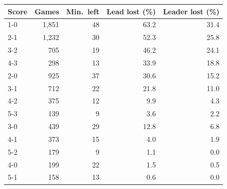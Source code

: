 \begin{tabular}{lrrrr}\toprule
Score & Games & Min.\ left & Lead lost (\%) & Leader lost (\%)\\\midrule
1-0 & 1,851 & 48 & 63.2 & 31.4\\
2-1 & 1,232 & 30 & 52.3 & 25.8\\
3-2 & 705 & 19 & 46.2 & 24.1\\
4-3 & 298 & 13 & 33.9 & 18.8\\
2-0 & 925 & 37 & 30.6 & 15.2\\
3-1 & 712 & 22 & 21.8 & 11.0\\
4-2 & 375 & 12 & 9.9 & 4.3\\
5-3 & 139 & 9 & 3.6 & 2.2\\
3-0 & 439 & 29 & 12.8 & 6.8\\
4-1 & 373 & 15 & 4.0 & 1.9\\
5-2 & 179 & 9 & 1.1 & 0.0\\
4-0 & 199 & 22 & 1.5 & 0.5\\
5-1 & 158 & 13 & 0.6 & 0.0\\
\bottomrule\end{tabular}